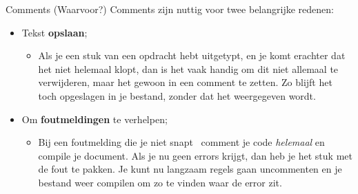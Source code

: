 \begin{frame}[fragile]{Comments (Waarvoor?)}
    Comments zijn nuttig voor twee belangrijke redenen:
    \begin{itemize}[label={\textbullet}]
        \pause 
        \item Tekst \textbf{opslaan};
        \pause 
        \begin{itemize}[label=$\blacktriangleright$]
            \item  Als je een stuk van een opdracht hebt uitgetypt, en je komt erachter dat het niet helemaal klopt, 
                dan is het vaak handig om dit niet allemaal te verwijderen, maar het gewoon in een comment te 
                zetten. Zo blijft het toch opgeslagen in je bestand, zonder dat het weergegeven wordt.
        \end{itemize}
        \pause 
        \item Om \textbf{foutmeldingen} te verhelpen;
        \pause
        \begin{itemize}[label=$\blacktriangleright$]
            \item Bij een foutmelding die je niet snapt \textrightarrow \, comment je code \emph{helemaal} 
                en compile je document. Als je nu geen errors krijgt, dan heb je het stuk met de fout te pakken. 
                Je kunt nu langzaam regels gaan uncommenten en je bestand weer compilen om zo te vinden 
                waar de error zit. 
        \end{itemize}
    \end{itemize}
\end{frame}

